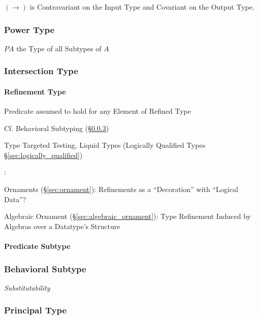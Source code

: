 $(\rightarrow)$ is Contravariant on the Input Type and Covariant on
the Output Type.



\subsubsection{Power Type}\label{sec:power_type}

$P A$ the Type of all Subtypes of $A$



\subsubsection{Intersection Type}\label{sec:intersection_type}

\paragraph{Refinement Type}\label{sec:refinement_type}\hfill

Predicate assumed to hold for any Element of Refined Type

\fist Cf. Behavioral Subtyping (\S\ref{sec:behavioral_subtype})

Type Targeted Testing, Liquid Types (Logically Qualified Types
\S\ref{sec:logically_qualified})


\asterism


\cite{mcbride13}:

Ornaments (\S\ref{sec:ornament}): Refinements as a ``Decoration'' with
``Logical Data''? %

Algebraic Ornament (\S\ref{sec:algebraic_ornament}): Type Refinement
Induced by Algebras over a Datatype's Structure



\paragraph{Predicate Subtype}\label{sec:predicate_subtype}\hfill



\subsubsection{Behavioral Subtype}\label{sec:behavioral_subtype}

\emph{Substitutability}



\subsubsection{Principal Type}\label{sec:principal_type}

